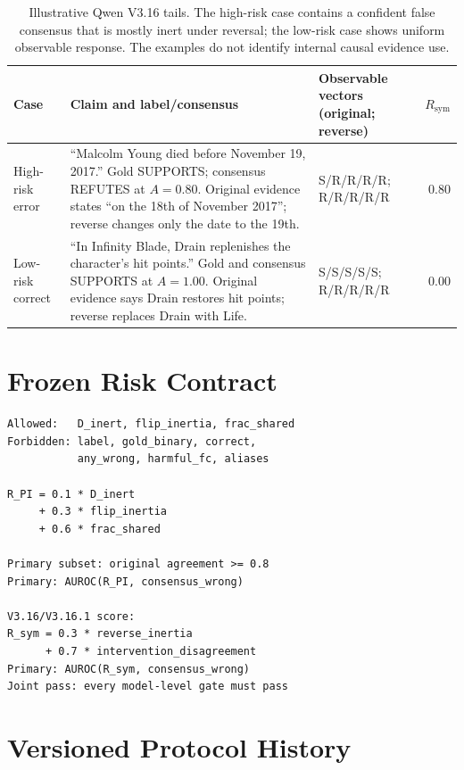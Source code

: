 \documentclass[11pt]{article}
\begin{document}
\begin{table}[t]
\centering
\scriptsize
\setlength{\tabcolsep}{4pt}
\begin{tabular}{lp{}p{}r}
\toprule
Case & Claim and label/consensus & Observable vectors (original; reverse) & $R_{\mathrm{sym}}$ \\
\midrule
High-risk error & ``Malcolm Young died before November 19, 2017.'' Gold SUPPORTS; consensus REFUTES at $A=0.80$. Original evidence states ``on the 18th of November 2017''; reverse changes only the date to the 19th. & S/R/R/R/R; R/R/R/R/R & 0.80 \\
Low-risk correct & ``In Infinity Blade, Drain replenishes the character's hit points.'' Gold and consensus SUPPORTS at $A=1.00$. Original evidence says Drain restores hit points; reverse replaces Drain with Life. & S/S/S/S/S; R/R/R/R/R & 0.00 \\
\bottomrule
\end{tabular}
\caption{Illustrative Qwen V3.16 tails. The high-risk case contains a confident false consensus that is mostly inert under reversal; the low-risk case shows uniform observable response. The examples do not identify internal causal evidence use.}
\label{tab:tail-examples}
\end{table}

\section{Frozen Risk Contract}

\begin{verbatim}
Allowed:   D_inert, flip_inertia, frac_shared
Forbidden: label, gold_binary, correct,
           any_wrong, harmful_fc, aliases

R_PI = 0.1 * D_inert
     + 0.3 * flip_inertia
     + 0.6 * frac_shared

Primary subset: original agreement >= 0.8
Primary: AUROC(R_PI, consensus_wrong)

V3.16/V3.16.1 score:
R_sym = 0.3 * reverse_inertia
      + 0.7 * intervention_disagreement
Primary: AUROC(R_sym, consensus_wrong)
Joint pass: every model-level gate must pass
\end{verbatim}

\section{Versioned Protocol History}
\end{document}
